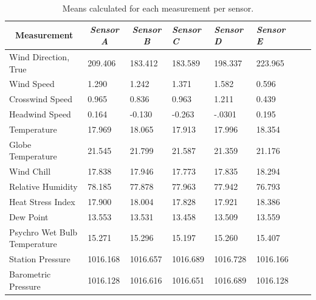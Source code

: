 \documentclass[a4paper,12pt]{article} %
\begin{document}
\begin{enumerate}
\begin{table}[H]
\centering
\caption{Means calculated for each measurement per sensor.}
\begin{tabular}{llllllll}
\multicolumn{1}{c}{\textbf{Measurement}} & \multicolumn{1}{c}{\textit{Sensor A}} & \multicolumn{1}{c}{\textit{Sensor B}} & \textit{Sensor C} & \textit{Sensor D} & \textit{Sensor E}  \\ \hline
Wind Direction, True                  & 209.406               & 183.412               & 183.589             & 198.337            & 223.965 \\
Wind Speed             & 1.290                                 &1.242                     & 1.371             & 1.582            & 0.596 \\
Crosswind Speed             &0.965          &0.836                     & 0.963             & 1.211            & 0.439 \\
Headwind Speed             &0.164          &-0.130                     & -0.263             & -.0301            & 0.195 \\
Temperature             &17.969          &18.065                     &17.913             &17.996            & 18.354 \\
Globe Temperature             &21.545          &21.799                     &21.587             &21.359            &21.176 \\
Wind Chill             &17.838          &17.946                     &17.773             &17.835            & 18.294 \\
Relative Humidity             &78.185          &77.878                     &77.963             &77.942            & 76.793 \\
Heat Stress Index             &17.900          &18.004                     &17.828             &17.921            & 18.386 \\
Dew Point             &13.553          &13.531                     &13.458             &13.509            & 13.559 \\
Psychro Wet Bulb Temperature             &15.271          &15.296                     &15.197             &15.260            & 15.407 \\
Station Pressure             &1016.168          &1016.657                 &1016.689             &1016.728            & 1016.166 \\
Barometric Pressure             &1016.128          &1016.616                &1016.651             &1016.689            & 1016.128 \\

\end{tabular}
\end{table}
\end{enumerate}
\end{document}
